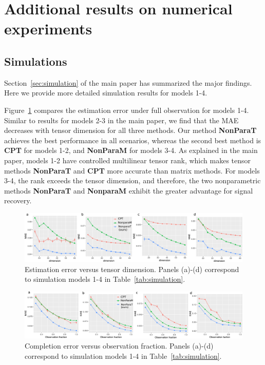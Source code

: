 \documentclass[11pt]{article}
\theoremstyle{plain}
\theoremstyle{definition}
\begin{document}
\section{Additional results on numerical experiments}\label{sec:data}
\subsection{Simulations}\label{sec:moresim}
Section~\ref{sec:simulation} of the main paper has summarized the major findings. Here we provide more detailed simulation results for models 1-4.

Figure~\ref{fig:compare1} compares the estimation error under full observation for models 1-4.  Similar to results for models 2-3 in the main paper,  we find that the MAE decreases with tensor dimension for all three methods. Our method {\bf NonParaT} achieves the best performance in all scenarios, whereas the second best method is {\bf CPT} for models 1-2, and {\bf NonParaM} for models 3-4.  As explained in the main paper, models 1-2 have controlled multilinear tensor rank, which makes tensor methods {\bf NonParaT} and {\bf CPT} more accurate than matrix methods. For models 3-4, the rank exceeds the tensor dimension, and therefore, the two nonparametric methods {\bf NonParaT} and {\bf NonparaM} exhibit the greater advantage for signal recovery. 

\begin{figure}[h!]
\includegraphics[width=\textwidth]{figure/fig1-4v2.pdf}
\caption{Estimation error versus tensor dimension. Panels (a)-(d) correspond to simulation models 1-4 in Table~\ref{tab:simulation}.}\label{fig:compare1}
\end{figure}

\begin{figure}[H]
\includegraphics[width=\textwidth]{figure/fig5-8v2.pdf}
\caption{Completion error versus observation fraction. Panels (a)-(d) correspond to simulation models 1-4 in Table~\ref{tab:simulation}. }\label{fig:compare2}
\end{figure}
\end{document}

